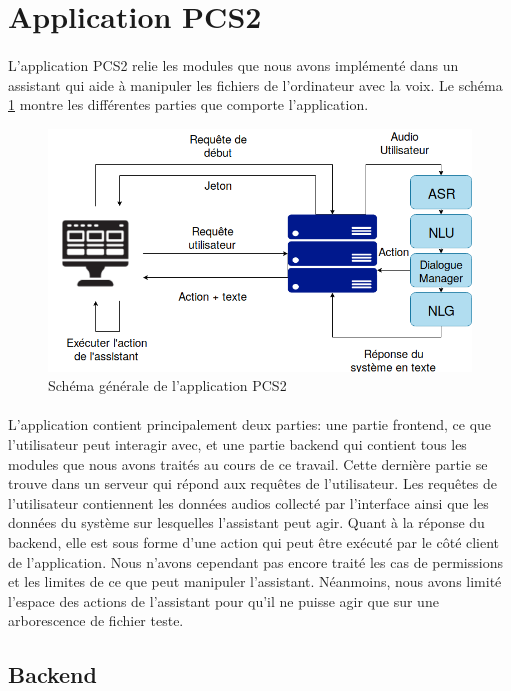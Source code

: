 \section{Application PCS2}
\paragraph{}L'application PCS2 relie les modules que nous avons implémenté dans un assistant qui aide à manipuler les fichiers de l'ordinateur avec la voix. Le schéma \ref{schema_app} montre les différentes parties que comporte l'application.
\begin{figure}[H] 
	\centering
	\includegraphics[width=0.95\linewidth]{images/Realisation/schema_app.png}
	\caption{Schéma générale de l'application PCS2}\label{schema_app}
\end{figure}
\paragraph{}L'application contient principalement deux parties: une partie frontend, ce que l'utilisateur peut interagir avec, et une partie backend qui contient tous les modules que nous avons traités au cours de ce travail. Cette dernière partie se trouve dans un serveur qui répond aux requêtes de l'utilisateur. Les requêtes de l'utilisateur contiennent les données audios collecté par l'interface ainsi que les données du système sur lesquelles l'assistant peut agir. Quant à la réponse du backend, elle est sous forme d'une action qui peut être exécuté par le côté client de l'application. Nous n'avons cependant pas encore traité les cas de permissions et les limites de ce que peut manipuler l'assistant. Néanmoins, nous avons limité l'espace des actions de l'assistant pour qu'il ne puisse agir que sur une arborescence de fichier teste.
\subsection{Backend}
